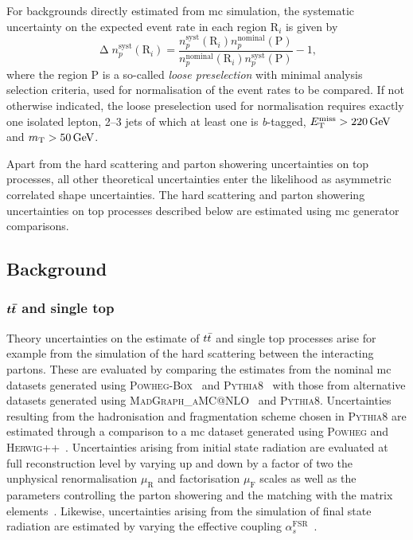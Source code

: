  For backgrounds directly estimated from \gls{mc} simulation, the systematic uncertainty on the expected event rate in each region R$_i$ is given by
 \begin{equation}
 	\upDelta n_p^\mathrm{syst}(\mathrm{R}_i) = \frac{n_p^\mathrm{syst}(\mathrm{R}_i)n_p^\mathrm{nominal}(\mathrm{P})}{n_p^\mathrm{nominal}(\mathrm{R}_i)n_p^\mathrm{syst}(\mathrm{P})} - 1,
 \end{equation}
 where the region P is a so-called \textit{loose preselection} with minimal analysis selection criteria, used for normalisation of the event rates to be compared.
 If not otherwise indicated, the loose preselection used for normalisation requires exactly one isolated lepton, 2--3 jets of which at least one is \textit{b}-tagged, $\etmiss>\SI{220}{\GeV}$ and $\mt>\SI{50}{\GeV}$.
 
 Apart from the hard scattering and parton showering uncertainties on top processes, all other theoretical uncertainties enter the likelihood as asymmetric correlated shape uncertainties.
 The hard scattering and parton showering uncertainties on top processes described below are estimated using \gls{mc} generator comparisons.
 
 \subsection{Background}
 
 \subsubsection{$\makemebold{\ttbar}$ and single top}
 
 Theory uncertainties on the estimate of $t\bar{t}$ and single top processes arise for example from the simulation of the hard scattering between the interacting partons.
 These are evaluated by comparing the estimates from the nominal \gls{mc} datasets generated using \textsc{Powheg-Box}~\cite{PowhegBox:2010xd} and \textsc{Pythia8}~\cite{Pythia8:2007gs} with those from alternative datasets generated using \textsc{MadGraph\_aMC@NLO}~\cite{MGaMCNLO:2014hca,Frederix:2012ps} and \textsc{Pythia8}.
 Uncertainties resulting from the hadronisation and fragmentation scheme chosen in \textsc{Pythia8} are estimated through a comparison to a \gls{mc} dataset generated using \textsc{Powheg} and \textsc{Herwig++}~\cite{Herwig:2015jjp}.
 Uncertainties arising from initial state radiation are evaluated at full reconstruction level by varying up and down by a factor of two the unphysical renormalisation $\mu_\mathrm{R}$ and factorisation $\mu_\mathrm{F}$ scales as well as the parameters controlling the parton showering and the matching with the matrix elements~\cite{ATL-PHYS-PUB-2016-004}.
 Likewise, uncertainties arising from the simulation of final state radiation are estimated by varying the effective coupling $\alpha_s^{\mathrm{FSR}}$~\cite{ATL-PHYS-PUB-2016-004}. 
 
